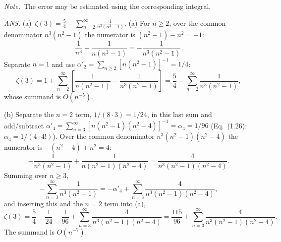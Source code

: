 \emph{Note.}~The error may be estimated using the corresponding integral.
\par\nobreak\hfill\emph{ANS.}\enspace
(a)~$\displaystyle\zeta(3)=\frac{5}{4}-\sum_{n=2}^{\infty}\frac{1}{n^{3}(n^{2}-1)}$.
\solution
{}
(a) For $n\ge2$, over the common denominator $n^3(n^2-1)$ the numerator
is $(n^2-1)-n^2=-1$:
\[
 \frac1{n^3}-\frac1{n(n^2-1)}
 =-\frac1{n^3(n^2-1)}.
\]
Separate $n=1$ and use $\alpha'_2=\sum_{n\ge2}[n(n^2-1)]^{-1}=1/4$:
\[
 \zeta(3)=1+\sum_{n=2}^\infty\left[\frac1{n(n^2-1)}-\frac1{n^3(n^2-1)}\right]
 =\frac54-\sum_{n=2}^\infty\frac1{n^3(n^2-1)},
\]
whose summand is $O(n^{-5})$.

(b) Separate the $n=2$ term, $1/(8\cdot3)=1/24$, in this last sum and add/subtract
$\alpha'_4=\sum_{n=3}^\infty[n(n^2-1)(n^2-4)]^{-1}=\alpha_4=1/96$
(Eq.~(1.26): $\alpha_4=1/(4\cdot4!)$).
Over the common denominator $n^3(n^2-1)(n^2-4)$ the numerator is
$-(n^2-4)+n^2=4$:
\[
 -\frac1{n^3(n^2-1)}+
 \frac1{n(n^2-1)(n^2-4)}
 =\frac4{n^3(n^2-1)(n^2-4)}.
\]
Summing over $n\ge3$,
\[
 -\sum_{n=3}^\infty\frac1{n^3(n^2-1)}
 =-\alpha'_4+\sum_{n=3}^\infty\frac4{n^3(n^2-1)(n^2-4)},
\]
and inserting this and the $n=2$ term into (a),
\[
 \boxed{\zeta(3)=\frac54-\frac1{24}-\frac1{96}
       +\sum_{n=3}^\infty\frac4{n^3(n^2-1)(n^2-4)}
       =\frac{115}{96}+\sum_{n=3}^\infty\frac4{n^3(n^2-1)(n^2-4)}}.
\]
The summand is $O(n^{-7})$.

